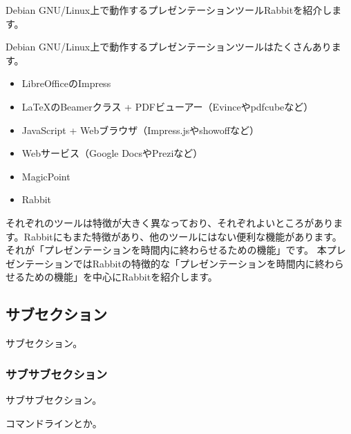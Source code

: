\documentclass[mingoth,a4paper]{jsarticle}
\begin{document}
\label{sec:kou}

Debian GNU/Linux上で動作するプレゼンテーションツールRabbitを紹介します。

Debian GNU/Linux上で動作するプレゼンテーションツールはたくさんあります。

\begin{itemize}
 \item LibreOfficeのImpress
 \item LaTeXのBeamerクラス + PDFビューアー（Evinceやpdfcubeなど）
 \item JavaScript + Webブラウザ（Impress.jsやshowoffなど）
 \item Webサービス（Google DocsやPreziなど）
 \item MagicPoint
 \item Rabbit
\end{itemize}

それぞれのツールは特徴が大きく異なっており、それぞれよいところがありま
す。Rabbitにもまた特徴があり、他のツールにはない便利な機能があります。
それが「プレゼンテーションを時間内に終わらせるための機能」です。 本プレ
ゼンテーションではRabbitの特徴的な「プレゼンテーションを時間内に終わら
せるための機能」を中心にRabbitを紹介します。

\subsection{サブセクション}

サブセクション。

\subsubsection{サブサブセクション}

サブサブセクション。

\begin{commandline}
コマンドラインとか。
\end{commandline}
\end{document}
